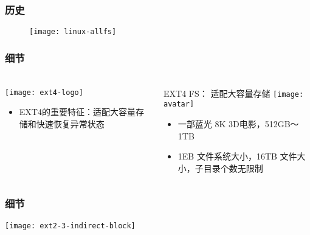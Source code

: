 \begin{frame}[fragile]
	\frametitle{历史}
	\begin{figure}
		\texttt{[image: linux-allfs]}
	\end{figure}

\end{frame}



\begin{frame}[fragile]
	\frametitle{细节}
	
	\frametitle{ }
	\begin{columns}[t]
		\begin{column}{.3\textwidth}
			
			\texttt{[image: ext4-logo]}
			\begin{itemize}
				\item EXT4的重要特征：适配大容量存储和快速恢复异常状态
				
			\end{itemize}
			
		\end{column}
		
		\begin{column}{.7\textwidth}			
			EXT4 FS： 适配大容量存储
			\texttt{[image: avatar]}
			\begin{itemize}
				\item 一部蓝光 8K 3D电影，512GB～1TB
				\item 1EB 文件系统大小，16TB 文件大小，子目录个数无限制
			\end{itemize}
			
		\end{column}
	\end{columns}
	
\end{frame}


\begin{frame}[fragile]
	\frametitle{细节}
	\centering
    \texttt{[image: ext2-3-indirect-block]}
	
\end{frame}

